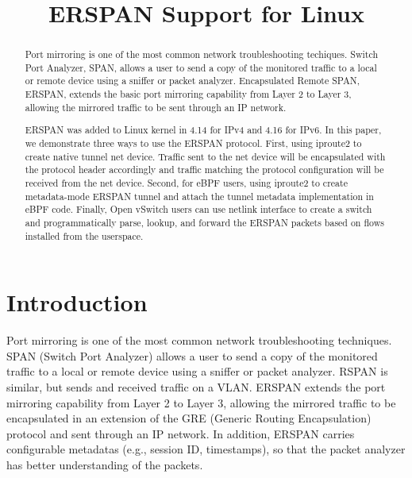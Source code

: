 \documentclass{sigplanconf}
\begin{document}
\title{ERSPAN Support for Linux}
{}{}

\maketitle

\begin{abstract}
Port mirroring is one of the most common network troubleshooting techiques.
Switch Port Analyzer, SPAN, allows a user to send a copy of the monitored traffic
to a local or remote device using a sniffer or packet analyzer.
Encapsulated Remote SPAN, ERSPAN, extends the basic port mirroring capability
from Layer 2 to Layer 3, allowing the mirrored traffic to be sent through an IP network. 

ERSPAN was added to Linux kernel in 4.14 for IPv4 and 4.16 for IPv6.
In this paper, we demonstrate three ways to use the ERSPAN protocol.
First, using iproute2 to create native tunnel net device.
Traffic sent to the net device will be encapsulated with the protocol header
accordingly and traffic matching the protocol configuration will be received
from the net device.  Second, for eBPF users, using iproute2 to create metadata-mode
ERSPAN tunnel and attach the tunnel metadata implementation in eBPF code.
Finally, Open vSwitch users can use netlink interface to create a switch
and programmatically parse, lookup, and forward the ERSPAN packets based on flows
installed from the userspace.

\end{abstract}

\section{Introduction}\label{introduction}
Port mirroring is one of the most common network troubleshooting techniques.
SPAN (Switch Port Analyzer) allows a user to send a copy of the monitored traffic
to a local or remote device using a sniffer or packet analyzer.
RSPAN is similar, but sends and received traffic on a VLAN. ERSPAN extends the
port mirroring capability from Layer 2 to Layer 3, allowing the mirrored traffic
to be encapsulated in an extension of the GRE (Generic Routing Encapsulation) protocol
and sent through an IP network.  In addition, ERSPAN carries configurable metadatas
(e.g., session ID, timestamps), so that the packet analyzer has better understanding
of the packets.
\end{document}
